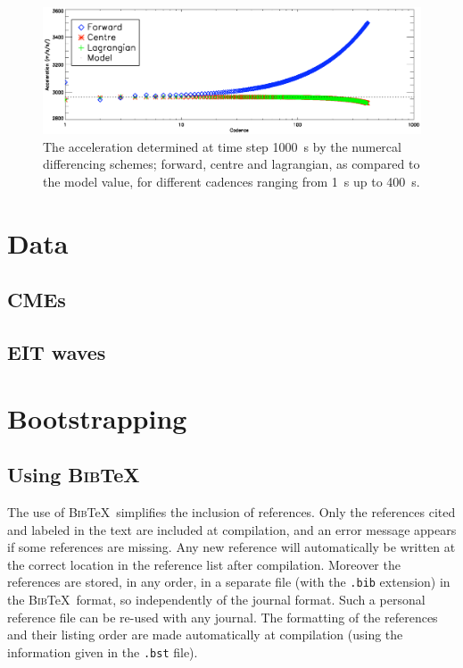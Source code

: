\documentclass[namedreferences]{SolarPhysics}
\newcommand{\BibTeX}{\textsc{Bib}\TeX}
\begin{document}
\begin{article}
\begin{figure}
 \centerline{\includegraphics[width=\linewidth]{images/kins_cadence_fixed1000.ps}}
   \caption{The acceleration determined at time step 1000~s by the numercal differencing schemes; forward, centre and lagrangian, as compared to the model value, for different cadences ranging from 1~s up to 400~s.}
    \label{kins_cadence_fixed1000}
\end{figure}



\section{Data}

\subsection{CMEs}

\subsection{EIT waves}

\section{Bootstrapping}

      
\subsection{Using \BibTeX} %
  \label{S-BibTeX}
  The use of \BibTeX\ simplifies the inclusion of references. Only the 
references cited and labeled in the text are included at compilation, 
and an error message appears if some references
are missing.  Any new reference will automatically be written at the correct 
location in the reference list after compilation. 
Moreover the references are stored, in any order, in a separate file
(with the \texttt{.bib} extension) in the \BibTeX\ format, so independently of 
the journal format. Such a personal reference file can be re-used with any journal.
The formatting of the references and their listing order are made automatically
at compilation (using the information given in the \texttt{.bst} file). 
        

\end{article}
\end{document}
